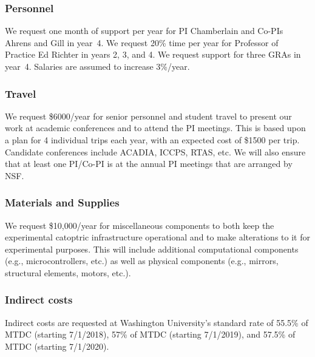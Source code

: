 \documentclass[11pt]{article}
\begin{document}
\subsubsection*{Personnel}
We request one month of support per year for PI Chamberlain and Co-PIs
Ahrens and Gill in year~4.
We request 20\% time per year for Professor of Practice Ed Richter
in years 2, 3, and 4.
We request support for three GRAs in year~4. Salaries are 
assumed to increase 3\%/year. 

\subsubsection*{Travel}
We request \$6000/year for senior personnel and student travel
to present our work at academic 
conferences and to attend the PI meetings.
This is based upon a plan for 4 individual trips
each year, with an expected cost of \$1500 per trip.
Candidate conferences include ACADIA, ICCPS, RTAS, etc.
We will also ensure that at least one PI/Co-PI is
at the annual PI meetings that are arranged by NSF. 

\subsubsection*{Materials and Supplies}
We request \$10,000/year for
miscellaneous components to both keep the experimental catoptric
infrastructure operational and to make alterations to it for
experimental purposes. This will
include additional computational components (e.g., microcontrollers, etc.)
as well as physical components (e.g., mirrors, structural elements, motors,
etc.).

\subsubsection*{Indirect costs}
Indirect costs are requested at Washington University's standard rate of
55.5\% of MTDC (starting 7/1/2018), 57\% of MTDC (starting 7/1/2019), and
57.5\% of MTDC (starting 7/1/2020).

\end{document}
